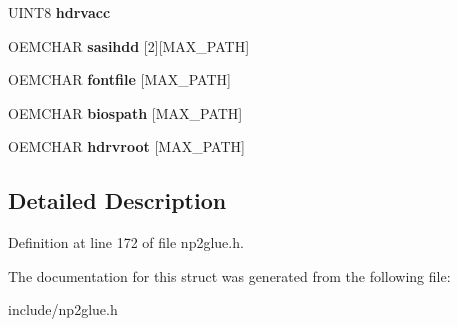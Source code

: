 \begin{DoxyCompactItemize}
\item 
\hypertarget{structNP2CFG_a3fcb7abdb9a79824af6d08d619939bfd}{U\-I\-N\-T8 {\bfseries hdrvacc}}\label{structNP2CFG_a3fcb7abdb9a79824af6d08d619939bfd}

\item 
\hypertarget{structNP2CFG_a10760e7864ee87a272f11d69b443bd9a}{O\-E\-M\-C\-H\-A\-R {\bfseries sasihdd} \mbox{[}2\mbox{]}\mbox{[}M\-A\-X\-\_\-\-P\-A\-T\-H\mbox{]}}\label{structNP2CFG_a10760e7864ee87a272f11d69b443bd9a}

\item 
\hypertarget{structNP2CFG_aad32a36f7c3efd58e91ac63364217251}{O\-E\-M\-C\-H\-A\-R {\bfseries fontfile} \mbox{[}M\-A\-X\-\_\-\-P\-A\-T\-H\mbox{]}}\label{structNP2CFG_aad32a36f7c3efd58e91ac63364217251}

\item 
\hypertarget{structNP2CFG_aa7824b99760945ec89ab24bd58a02f54}{O\-E\-M\-C\-H\-A\-R {\bfseries biospath} \mbox{[}M\-A\-X\-\_\-\-P\-A\-T\-H\mbox{]}}\label{structNP2CFG_aa7824b99760945ec89ab24bd58a02f54}

\item 
\hypertarget{structNP2CFG_a384ccba7ed9a3a5ac5834f2188762322}{O\-E\-M\-C\-H\-A\-R {\bfseries hdrvroot} \mbox{[}M\-A\-X\-\_\-\-P\-A\-T\-H\mbox{]}}\label{structNP2CFG_a384ccba7ed9a3a5ac5834f2188762322}

\end{DoxyCompactItemize}


\subsection{Detailed Description}


Definition at line 172 of file np2glue.\-h.



The documentation for this struct was generated from the following file\-:\begin{DoxyCompactItemize}
\item 
include/np2glue.\-h\end{DoxyCompactItemize}
